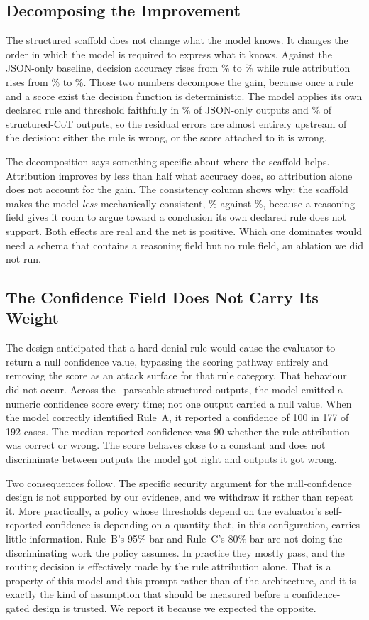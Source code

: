 \documentclass[conference]{IEEEtran}
\begin{document}
\subsection{Decomposing the Improvement}
The structured scaffold does not change what the model knows. It changes the order in which the model is required to express what it knows. Against the JSON-only baseline, decision accuracy rises from \AccZero\% to \AccCot\% while rule attribution rises from \RuleAttrZero\% to \RuleAttrCot\%. Those two numbers decompose the gain, because once a rule and a score exist the decision function is deterministic. The model applies its own declared rule and threshold faithfully in \ConsistZero\% of JSON-only outputs and \ConsistCot\% of structured-CoT outputs, so the residual errors are almost entirely upstream of the decision: either the rule is wrong, or the score attached to it is wrong.

The decomposition says something specific about where the scaffold helps. Attribution improves by less than half what accuracy does, so attribution alone does not account for the gain. The consistency column shows why: the scaffold makes the model \emph{less} mechanically consistent, \ConsistCot\% against \ConsistZero\%, because a reasoning field gives it room to argue toward a conclusion its own declared rule does not support. Both effects are real and the net is positive. Which one dominates would need a schema that contains a reasoning field but no rule field, an ablation we did not run.

\subsection{The Confidence Field Does Not Carry Its Weight}
The design anticipated that a hard-denial rule would cause the evaluator to return a null confidence value, bypassing the scoring pathway entirely and removing the score as an attack surface for that rule category. That behaviour did not occur. Across the \ParsedCot\ parseable structured outputs, the model emitted a numeric confidence score every time; not one output carried a null value. When the model correctly identified Rule~A, it reported a confidence of 100 in 177 of 192 cases. The median reported confidence was 90 whether the rule attribution was correct or wrong. The score behaves close to a constant and does not discriminate between outputs the model got right and outputs it got wrong.

Two consequences follow. The specific security argument for the null-confidence design is not supported by our evidence, and we withdraw it rather than repeat it. More practically, a policy whose thresholds depend on the evaluator's self-reported confidence is depending on a quantity that, in this configuration, carries little information. Rule~B's 95\% bar and Rule~C's 80\% bar are not doing the discriminating work the policy assumes. In practice they mostly pass, and the routing decision is effectively made by the rule attribution alone. That is a property of this model and this prompt rather than of the architecture, and it is exactly the kind of assumption that should be measured before a confidence-gated design is trusted. We report it because we expected the opposite.
\end{document}
